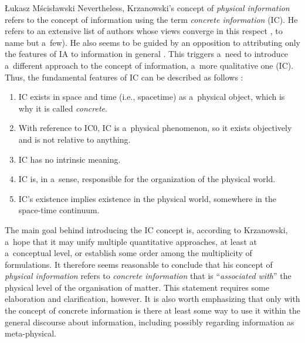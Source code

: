 \begin{artengenv}{Łukasz Mścisławski}
Nevertheless, Krzanowski's concept of \textit{physical information} refers to the concept of information using the term \textit{concrete information} (IC). He refers to an extensive list of authors whose views converge in this respect
\parencites[e.g.,][]{turek_filozoficzne_1978}[][]{von_weizsacker_einheit_1982}[][]{nagel_mind_2012}[][]{dodig-crnkovic_alan_2013}[][]{heller_elementy_2014}[][]{rovelli_meaning_2016}[][]{wilczek_beautiful_2016}[][]{davies_demon_2020}, %
 to name but a~few). He also seems to be guided by an opposition to attributing only the features of IA to information in general 
\parencites[cf.][]{krzanowski_does_2020}[][]{krzanowski_why_2020}. %
 This triggers a~need to introduce a~different approach to the concept of information, a~more qualitative one (IC). Thus, the fundamental features of IC can be described as follows 
\parencite[cf.][p.2]{krzanowski_what_2020}:%
\begin{enumerate}[label=(IC\arabic*), start=0]
\item IC exists in space and time (i.e., spacetime) as a~physical object, which is why it is called \textit{concrete}.
\item With reference to IC0, IC is a~physical phenomenon, so it exists objectively and is not relative to anything.
\item IC has no intrinsic meaning.
\item IC is, in a~sense, responsible for the organization of the physical world.
\item IC's existence implies existence in the physical world, somewhere in the space-time continuum.
\end{enumerate}

The main goal behind introducing the IC concept is, according to Krzanowski, a~hope that it may unify multiple quantitative approaches, at least at a~conceptual level, or establish some order among the multiplicity of formulations. It therefore seems reasonable to conclude that his concept of \textit{physical information} refers to \textit{concrete information} that is ``\textit{associated with}'' the physical level of the organisation of matter. This statement requires some elaboration and clarification, however. It is also worth emphasizing that only with the concept of concrete information is there at least some way to use it within the general discourse about information, including possibly regarding information as meta-physical.


\end{artengenv}
